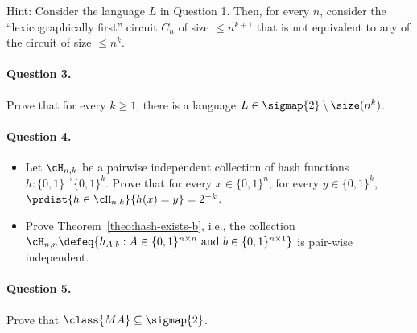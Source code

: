 \documentclass[11pt, a4paper]{article}
\begin{document}
\vspace{0.2cm}
\noindent
Hint: Consider the language $L$ in Question 1. Then, for every $n$,
consider the ``lexicographically first'' circuit $C_n$ of size $\leq n^{k+1}$
that is not equivalent to any of the circuit of size $\leq n^k$.

\paragraph*{Question 3.}
Prove that for every $k\geq 1$,
there is a language $L \in \sigmap {2} \setminus \size(n^k)$.



\paragraph*{Question 4.}
\begin{itemize}
\item
Let $\cH_{n,k}$ be a pairwise independent collection of hash functions $h:\{0,1\}^\to\{0,1\}^k$.
Prove that for every $x\in \{0,1\}^n$, for every $y \in \{0,1\}^k$,
$\prdist {h\in \cH_{n,k}} { h(x)=y }  =  2^{-k}$.
\item
Prove Theorem~\ref{theo:hash-exists-b}, i.e.,
the collection $\cH_{n,n} \defeq \{h_{A,b} : A \in \{0,1\}^{n\times n}\ \text{and}\ b \in \{0,1\}^{n\times 1}\}$ 
is pair-wise independent.
\end{itemize}


\paragraph*{Question 5.}
Prove that $\class{MA}\subseteq \sigmap{2}$.
\end{document}
